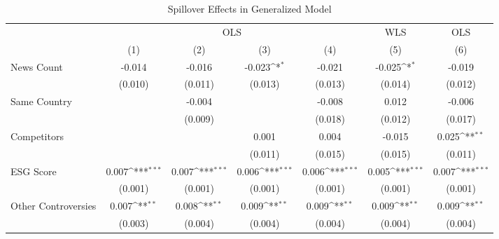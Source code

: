 \begin{table}[htbp]\centering
\def\sym#1{\ifmmode^{#1}\else\(^{#1}\)\fi}
\caption{Spillover Effects in Generalized Model}
\begin{tabular}{l*{6}{c}}
\toprule
                    &\multicolumn{4}{c}{OLS}                                                                &\multicolumn{1}{c}{WLS}&\multicolumn{1}{c}{OLS}\\\cmidrule(lr){2-5}\cmidrule(lr){6-6}\cmidrule(lr){7-7}
                    &\multicolumn{1}{c}{(1)}         &\multicolumn{1}{c}{(2)}         &\multicolumn{1}{c}{(3)}         &\multicolumn{1}{c}{(4)}         &\multicolumn{1}{c}{(5)}         &\multicolumn{1}{c}{(6)}         \\
\midrule
News Count          &      -0.014         &      -0.016         &      -0.023\sym{*}  &      -0.021         &      -0.025\sym{*}  &      -0.019         \\
                    &     (0.010)         &     (0.011)         &     (0.013)         &     (0.013)         &     (0.014)         &     (0.012)         \\
\addlinespace
Same Country        &                     &      -0.004         &                     &      -0.008         &       0.012         &      -0.006         \\
                    &                     &     (0.009)         &                     &     (0.018)         &     (0.012)         &     (0.017)         \\
\addlinespace
Competitors         &                     &                     &       0.001         &       0.004         &      -0.015         &       0.025\sym{**} \\
                    &                     &                     &     (0.011)         &     (0.015)         &     (0.015)         &     (0.011)         \\
\addlinespace
ESG Score           &       0.007\sym{***}&       0.007\sym{***}&       0.006\sym{***}&       0.006\sym{***}&       0.005\sym{***}&       0.007\sym{***}\\
                    &     (0.001)         &     (0.001)         &     (0.001)         &     (0.001)         &     (0.001)         &     (0.001)         \\
\addlinespace
Other Controversies &       0.007\sym{**} &       0.008\sym{**} &       0.009\sym{**} &       0.009\sym{**} &       0.009\sym{**} &       0.009\sym{**} \\
                    &     (0.003)         &     (0.004)         &     (0.004)         &     (0.004)         &     (0.004)         &     (0.004)         \\

\end{tabular}
\end{table}

